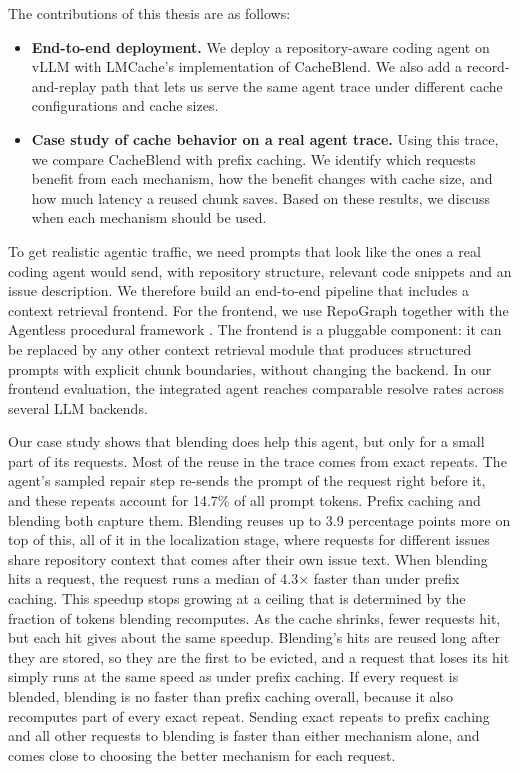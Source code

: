 The contributions of this thesis are as follows:

\begin{itemize}
    \item \textbf{End-to-end deployment.} We deploy a repository-aware coding agent on vLLM with LMCache's implementation of CacheBlend. We also add a record-and-replay path that lets us serve the same agent trace under different cache configurations and cache sizes.
    \item \textbf{Case study of cache behavior on a real agent trace.} Using this trace, we compare CacheBlend with prefix caching. We identify which requests benefit from each mechanism, how the benefit changes with cache size, and how much latency a reused chunk saves. Based on these results, we discuss when each mechanism should be used.
\end{itemize}

To get realistic agentic traffic, we need prompts that look like the ones a real coding agent would send, with repository structure, relevant code snippets and an issue description. We therefore build an end-to-end pipeline that includes a context retrieval frontend. For the frontend, we use RepoGraph \cite{ouyang2025repographenhancingaisoftware} together with the Agentless procedural framework \cite{xia2024agentlessdemystifyingllmbasedsoftware}. The frontend is a pluggable component: it can be replaced by any other context retrieval module that produces structured prompts with explicit chunk boundaries, without changing the backend. In our frontend evaluation, the integrated agent reaches comparable resolve rates across several LLM backends.

Our case study shows that blending does help this agent, but only for a small part of its requests. Most of the reuse in the trace comes from exact repeats. The agent's sampled repair step re-sends the prompt of the request right before it, and these repeats account for 14.7\% of all prompt tokens. Prefix caching and blending both capture them. Blending reuses up to 3.9 percentage points more on top of this, all of it in the localization stage, where requests for different issues share repository context that comes after their own issue text. When blending hits a request, the request runs a median of 4.3$\times$ faster than under prefix caching. This speedup stops growing at a ceiling that is determined by the fraction of tokens blending recomputes. As the cache shrinks, fewer requests hit, but each hit gives about the same speedup. Blending's hits are reused long after they are stored, so they are the first to be evicted, and a request that loses its hit simply runs at the same speed as under prefix caching. If every request is blended, blending is no faster than prefix caching overall, because it also recomputes part of every exact repeat. Sending exact repeats to prefix caching and all other requests to blending is faster than either mechanism alone, and comes close to choosing the better mechanism for each request.

